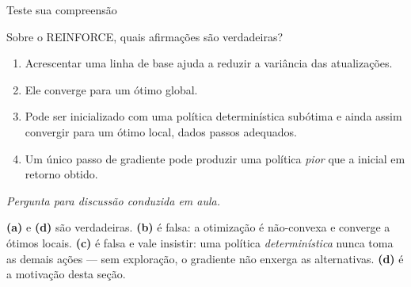 \documentclass[aspectratio=169, 10pt]{beamer}
\newcommand{\paradiscussao}{\smallskip
  {\footnotesize\color{rlCinza}\itshape Pergunta para discussão conduzida em aula.}}
\begin{document}
\begin{frame}{Teste sua compreensão}

  \begin{quizbox}{}
    Sobre o REINFORCE, quais afirmações são verdadeiras?
    \begin{enumerate}\setlength{\itemsep}{0.1ex}\small
      \item[(a)] Acrescentar uma linha de base ajuda a reduzir a variância das
        atualizações.
      \item[(b)] Ele converge para um ótimo global.
      \item[(c)] Pode ser inicializado com uma política determinística subótima e
        ainda assim convergir para um ótimo local, dados passos adequados.
      \item[(d)] Um único passo de gradiente pode produzir uma política
        \emph{pior} que a inicial em retorno obtido.
    \end{enumerate}
    \paradiscussao
  \end{quizbox}

  \pause
  \begin{respbox}
    \textbf{(a)} e \textbf{(d)} são verdadeiras. \textbf{(b)} é falsa: a otimização é
    não-convexa e converge a ótimos locais. \textbf{(c)} é falsa e vale insistir: uma
    política \emph{determinística} nunca toma as demais ações --- sem exploração, o
    gradiente não enxerga as alternativas. \textbf{(d)} é a motivação desta seção.
  \end{respbox}
\end{frame}
\end{document}
